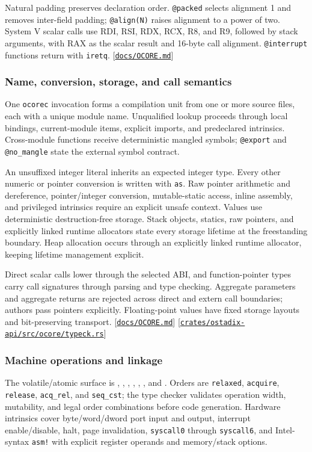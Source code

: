 \documentclass[11pt,oneside]{article}
\newcommand{\src}[1]{\textcolor{OSlate}{\scriptsize[\href{https://github.com/lostadi/OSTADIX/blob/c0b02c326b2329a95ba52447c7180bc93957cd57/#1}{\nolinkurl{#1}}]}\allowbreak}
\begin{document}
Natural padding preserves declaration order. \texttt{@packed} selects
alignment 1 and removes inter-field padding; \texttt{@align(N)} raises
alignment to a power of two. System V scalar calls use RDI, RSI, RDX, RCX, R8,
and R9, followed by stack arguments, with RAX as the scalar result and
16-byte call alignment. \texttt{@interrupt} functions return with
\texttt{iretq}. \src{docs/OCORE.md}

\subsubsection{Name, conversion, storage, and call semantics}

One \texttt{ocorec} invocation forms a compilation unit from one or more source
files, each with a unique module name. Unqualified lookup proceeds through
local bindings, current-module items, explicit imports, and predeclared
intrinsics. Cross-module functions receive deterministic mangled symbols;
\texttt{@export} and \texttt{@no\_mangle} state the external symbol contract.

An unsuffixed integer literal inherits an expected integer type. Every other
numeric or pointer conversion is written with \texttt{as}. Raw pointer
arithmetic and dereference, pointer/integer conversion, mutable-static access,
inline assembly, and privileged intrinsics require an explicit unsafe context.
Values use deterministic destruction-free storage. Stack objects, statics,
raw pointers, and explicitly linked runtime allocators state every storage
lifetime at the freestanding boundary. Heap allocation occurs through an
explicitly linked runtime allocator, keeping lifetime management explicit.

Direct scalar calls lower through the selected ABI, and function-pointer types
carry call signatures through parsing and type checking. Aggregate parameters
and aggregate returns are rejected across direct and extern call boundaries;
authors pass pointers explicitly. Floating-point values have fixed storage
layouts and bit-preserving transport. \src{docs/OCORE.md}
\src{crates/ostadix-api/src/ocore/typeck.rs}

\subsubsection{Machine operations and linkage}

The volatile/atomic surface is ,
, , ,
, , and
. Orders are \texttt{relaxed}, \texttt{acquire},
\texttt{release}, \texttt{acq\_rel}, and \texttt{seq\_cst}; the type checker
validates operation width, mutability, and legal order combinations before
code generation. Hardware intrinsics cover byte/word/dword port input and
output, interrupt enable/disable, halt, page invalidation, \texttt{syscall0}
through \texttt{syscall6}, and Intel-syntax \texttt{asm!} with explicit
register operands and memory/stack options.
\end{document}
